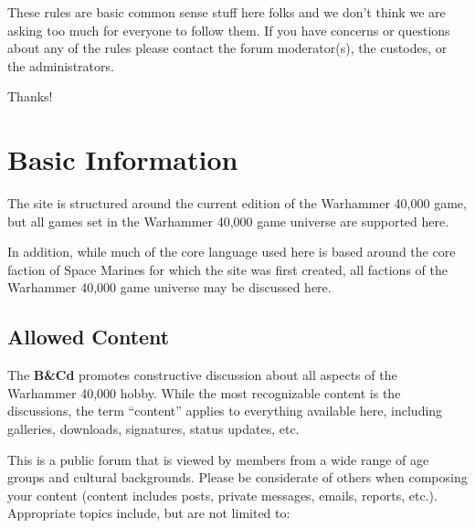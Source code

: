 \documentclass[12pt]{article}
\newcommand{\BnC}{{\textbf{B\&Cd}}}%
\begin{document}
\clearpage



\medskip

These rules are basic common sense stuff here folks and we don't think 
we are asking too much for everyone to follow them. If you have 
concerns or questions about any of the rules please contact the forum 
moderator(s), the custodes, or the administrators.
\medskip

Thanks!

\section{Basic Information}

The site is structured around the current edition of the Warhammer 
40,000 game, but all games set in the Warhammer 40,000 game universe 
are supported here.

In addition, while much of the core language used here is based around 
the core faction of Space Marines for which the site was first created, 
all factions of the Warhammer 40,000 game universe may be discussed 
here.

\subsection{Allowed Content}

The {\BnC} promotes constructive discussion about all 
aspects of the Warhammer 40,000 hobby. While the most recognizable 
content is the discussions, the term ``content'' applies to everything 
available here, including galleries, downloads, signatures, status 
updates, etc.

This is a public forum that is viewed by members from a wide range of 
age groups and cultural backgrounds. Please be considerate of others 
when composing your content (content includes posts, private messages, 
emails, reports, etc.). Appropriate topics include, but are not limited 
to:
\end{document}

